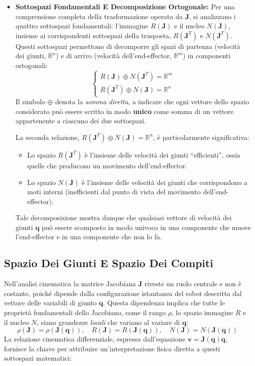 \documentclass[11pt, a4paper]{report}
\begin{document}
\begin{itemize}
    \item \textbf{Sottospazi Fondamentali E Decomposizione Ortogonale:} Per una comprensione completa della trasformazione operata da \(\bm{J}\), si analizzano i quattro sottospazi fondamentali: l'immagine \(R(\bm{J})\) e il nucleo \(N(\bm{J})\), insieme ai corrispondenti sottospazi della trasposta, \(R(\bm{J}^T)\) e \(N(\bm{J}^T)\). Questi sottospazi permettono di decomporre gli spazi di partenza (velocità dei giunti, \(\mathbb{R}^n\)) e di arrivo (velocità dell'end-effector, \(\mathbb{R}^m\)) in componenti ortogonali:
    \[
    \begin{cases}
        R(\bm{J}) \oplus N(\bm{J}^T) = \mathbb{R}^{m} \\
        R(\bm{J}^T) \oplus N(\bm{J}) = \mathbb{R}^{n}
    \end{cases}
    \]
    Il simbolo \(\oplus\) denota la \textit{somma diretta}, a indicare che ogni vettore dello spazio considerato può essere scritto in modo \textbf{unico} come somma di un vettore appartenente a ciascuno dei due sottospazi.

    La seconda relazione, $R(\bm{J}^T) \oplus N(\bm{J}) = \mathbb{R}^{n}$, è particolarmente significativa:
    \begin{itemize}
        \item Lo spazio \(R(\bm{J}^T)\) è l'insieme delle velocità dei giunti ``efficienti'', ossia quelle che producono un movimento dell'end-effector.
        \item Lo spazio \(N(\bm{J})\) è l'insieme delle velocità dei giunti che corrispondono a moti interni (inefficienti dal punto di vista del movimento dell'end-effector).
    \end{itemize}
    Tale decomposizione mostra dunque che qualsiasi vettore di velocità dei giunti \(\dot{\bm{q}}\) può essere scomposto in modo univoco in una componente che muove l'end-effector e in una componente che non lo fa.
\end{itemize}


\newpage
\subsection{Spazio Dei Giunti E Spazio Dei Compiti}
Nell'analisi cinematica la matrice Jacobiana $\bm{J}$ riveste un ruolo centrale e non è costante, poiché dipende dalla configurazione istantanea del robot descritta dal vettore delle variabili di giunto $\bm{q}$. Questa dipendenza implica che tutte le proprietà fondamentali dello Jacobiano, come il rango $\rho$, lo spazio immagine $R$ e il nucleo $N$, siano grandezze \textit{locali} che variano al variare di $\bm{q}$:
\[
    \rho(\bm{J}) = \rho(\bm{J}(\bm{q})), \quad R(\bm{J}) = R(\bm{J}(\bm{q})), \quad N(\bm{J}) = N(\bm{J}(\bm{q}))
\]
La relazione cinematica differenziale, espressa dall'equazione $\bm{v} = \bm{J}(\bm{q})\dot{\bm{q}}$, fornisce la chiave per attribuire un'interpretazione fisica diretta a questi sottospazi matematici:
\end{document}
